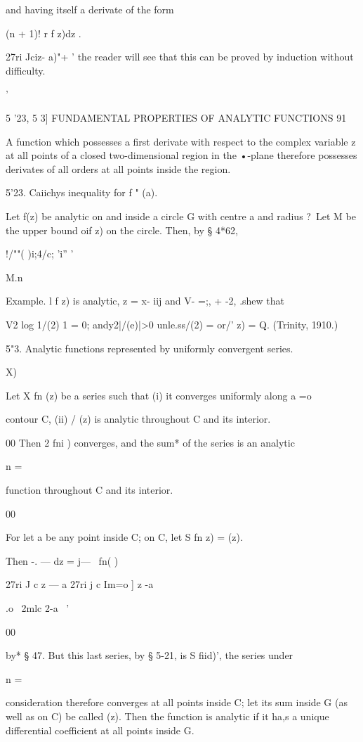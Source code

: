 {{and having itself a derivate of the form

(n + 1)! r f z)dz .

27ri Jciz- a)"+ ' the reader will see that this can be proved by
induction without difficulty.

 '

5 '23, 5 3] FUNDAMENTAL PROPERTIES OF ANALYTIC FUNCTIONS 91

A function which possesses a first derivate with respect to the
complex variable z at all points of a closed two-dimensional region in
the •-plane therefore possesses derivates of all orders at all points
inside the region.

5'23. Caiichys inequality for f " (a).

Let f(z) be analytic on and inside a circle G with centre a and radius
?\ Let M be the upper bound oif z) on the circle. Then, by § 4*62,

!/""( )i;4/c; 'i'' '

M.n\

Example. l f z) is analytic, z = x- iij and V- =;, + -2, .shew that

V2 log 1/(2) 1 = 0; andy2|/(e)|>0 unle.ss/(2) = or/' z) = Q. (Trinity,
1910.)

5"3. Analytic functions represented by uniformly convergent series.

 X)

Let X fn (z) be a series such that (i) it converges uniformly along a
=o

contour C, (ii) / (z) is analytic throughout C and its interior.

00 Then 2 fni ) converges, and the sum* of the series is an analytic

n =

function throughout C and its interior.

00

For let a be any point inside C; on C, let S fn z) = (z).

Then -. — dz = j— \ fn( )\

27ri J c z — a 27ri j c Im=o ] z -a

 .o \ 2mlc 2-a \ '

00

by* § 47. But this last series, by § 5-21, is S fiid)', the series
under

n =

consideration therefore converges at all points inside C; let its sum
inside G (as well as on C) be called (z). Then the function is
analytic if it ha,s a unique differential coefficient at all points
inside G.

}}
